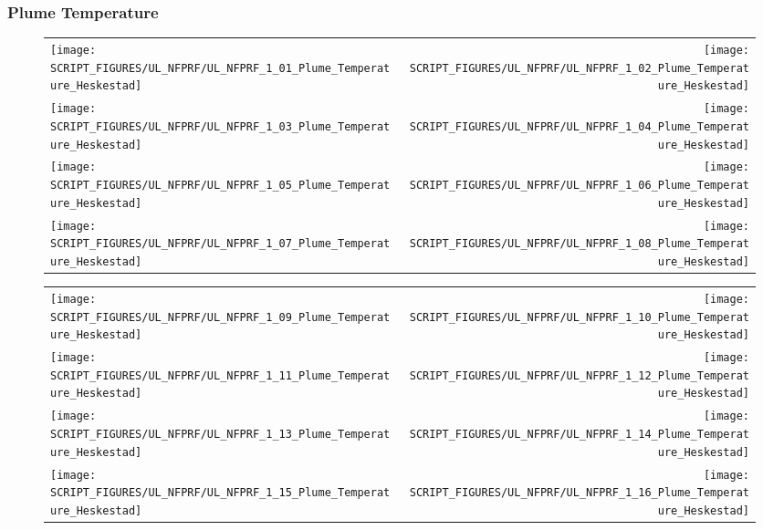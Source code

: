 \clearpage

\subsubsection{Plume Temperature}

\begin{figure}[p]
\begin{tabular*}{\textwidth}{l@{\extracolsep{\fill}}r}
\texttt{[image: SCRIPT\_FIGURES/UL\_NFPRF/UL\_NFPRF\_1\_01\_Plume\_Temperature\_Heskestad]} &
\texttt{[image: SCRIPT\_FIGURES/UL\_NFPRF/UL\_NFPRF\_1\_02\_Plume\_Temperature\_Heskestad]} \\
\texttt{[image: SCRIPT\_FIGURES/UL\_NFPRF/UL\_NFPRF\_1\_03\_Plume\_Temperature\_Heskestad]} &
\texttt{[image: SCRIPT\_FIGURES/UL\_NFPRF/UL\_NFPRF\_1\_04\_Plume\_Temperature\_Heskestad]} \\
\texttt{[image: SCRIPT\_FIGURES/UL\_NFPRF/UL\_NFPRF\_1\_05\_Plume\_Temperature\_Heskestad]} &
\texttt{[image: SCRIPT\_FIGURES/UL\_NFPRF/UL\_NFPRF\_1\_06\_Plume\_Temperature\_Heskestad]} \\
\texttt{[image: SCRIPT\_FIGURES/UL\_NFPRF/UL\_NFPRF\_1\_07\_Plume\_Temperature\_Heskestad]} &
\texttt{[image: SCRIPT\_FIGURES/UL\_NFPRF/UL\_NFPRF\_1\_08\_Plume\_Temperature\_Heskestad]}
\end{tabular*}
\end{figure}

\begin{figure}[p]
\begin{tabular*}{\textwidth}{l@{\extracolsep{\fill}}r}
\texttt{[image: SCRIPT\_FIGURES/UL\_NFPRF/UL\_NFPRF\_1\_09\_Plume\_Temperature\_Heskestad]} &
\texttt{[image: SCRIPT\_FIGURES/UL\_NFPRF/UL\_NFPRF\_1\_10\_Plume\_Temperature\_Heskestad]} \\
\texttt{[image: SCRIPT\_FIGURES/UL\_NFPRF/UL\_NFPRF\_1\_11\_Plume\_Temperature\_Heskestad]} &
\texttt{[image: SCRIPT\_FIGURES/UL\_NFPRF/UL\_NFPRF\_1\_12\_Plume\_Temperature\_Heskestad]} \\
\texttt{[image: SCRIPT\_FIGURES/UL\_NFPRF/UL\_NFPRF\_1\_13\_Plume\_Temperature\_Heskestad]} &
\texttt{[image: SCRIPT\_FIGURES/UL\_NFPRF/UL\_NFPRF\_1\_14\_Plume\_Temperature\_Heskestad]} \\
\texttt{[image: SCRIPT\_FIGURES/UL\_NFPRF/UL\_NFPRF\_1\_15\_Plume\_Temperature\_Heskestad]} &
\texttt{[image: SCRIPT\_FIGURES/UL\_NFPRF/UL\_NFPRF\_1\_16\_Plume\_Temperature\_Heskestad]}
\end{tabular*}
\end{figure}

